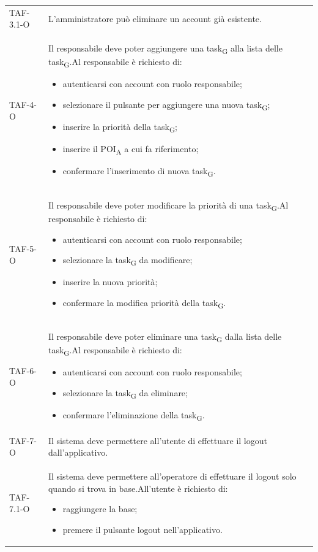 \begin{longtable}{ >{\centering}p{} >{}p{}
		>{\centering}p{}}
	TAF-3.1-O & L'amministratore può eliminare un account già esistente. & 0\tabularnewline

	TAF-4-O & Il responsabile deve poter aggiungere una task\textsubscript{G} alla lista delle task\textsubscript{G}.\newline Al responsabile è richiesto di: \begin{itemize}\item autenticarsi con account con ruolo responsabile; \item selezionare il pulsante per aggiungere una nuova task\textsubscript{G}; \item inserire la priorità della task\textsubscript{G}; \item inserire il POI\textsubscript{A} a cui fa riferimento; \item confermare l'inserimento di nuova task\textsubscript{G}. \end{itemize} & 0\tabularnewline

	TAF-5-O & Il responsabile deve poter modificare la priorità di una task\textsubscript{G}.\newline Al responsabile è richiesto di: \begin{itemize}\item autenticarsi con account con ruolo responsabile; \item selezionare la task\textsubscript{G} da modificare; \item inserire la nuova priorità; \item confermare la modifica priorità della task\textsubscript{G}. \end{itemize} & 0\tabularnewline

	TAF-6-O & Il responsabile deve poter eliminare una task\textsubscript{G} dalla lista delle task\textsubscript{G}.\newline Al responsabile è richiesto di: \begin{itemize} \item autenticarsi con account con ruolo responsabile; \item selezionare la task\textsubscript{G} da eliminare; \item confermare l'eliminazione della task\textsubscript{G}. \end{itemize} & 0\tabularnewline

	TAF-7-O & Il sistema deve permettere all'utente di effettuare il logout dall'applicativo. & 0\tabularnewline

	TAF-7.1-O & Il sistema deve permettere all'operatore di effettuare il logout solo quando si trova in base.\newline All'utente è richiesto di: \begin{itemize} \item raggiungere la base; \item premere il pulsante logout nell'applicativo. \end{itemize} & 0\tabularnewline


\end{longtable}
